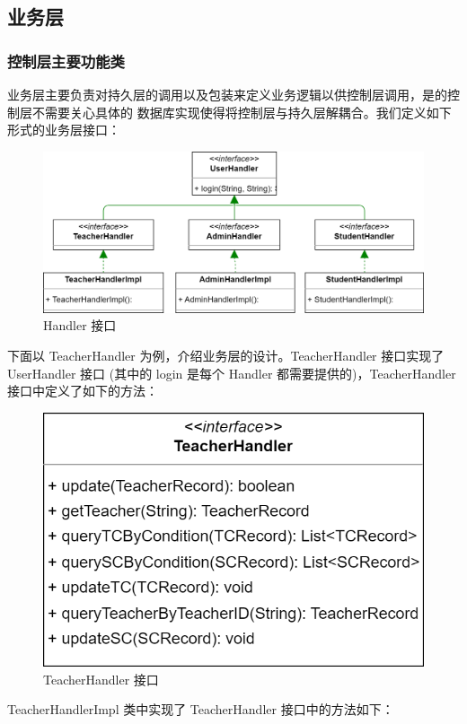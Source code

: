 \documentclass[12pt, a4paper]{article}
\begin{document}
\subsection{业务层}
\subsubsection{控制层主要功能类}
业务层主要负责对持久层的调用以及包装来定义业务逻辑以供控制层调用，是的控制层不需要关心具体的
数据库实现使得将控制层与持久层解耦合。我们定义如下形式的业务层接口：
\begin{figure}[H]
  \centering
  \includegraphics[width = 0.8 \textwidth]{ServiceInterface.png}
  \caption{Handler 接口}
\end{figure}
下面以 TeacherHandler 为例，介绍业务层的设计。TeacherHandler 接口实现了 UserHandler 接口
(其中的 login 是每个 Handler 都需要提供的)，TeacherHandler 接口中定义了如下的方法：
\begin{figure}[H]
  \centering
  \includegraphics[width = 0.6 \textwidth]{TeacherHandler.png}
  \caption{TeacherHandler 接口}
\end{figure}
TeacherHandlerImpl 类中实现了 TeacherHandler 接口中的方法如下：
\end{document}
